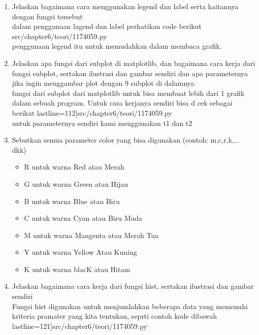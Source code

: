 \begin {enumerate}
\begin {enumerate}
					\item stack plot
					\\Penggunaan stack plot ini seperti diagram line, dengan warna yang mengisinua, serta antar line itu bisa berdekatan. Berikut Contoh penggunaannya
						 lastline=83]{src/chapter6/teori/1174059.py}
				\end {enumerate}
		\item Jelaskan bagaimana cara menggunakan legend dan label serta kaitannya dengan fungsi tersebut
		\\ dalam penggunaan lagend dan label perhatikan code berikut
			{src/chapter6/teori/1174059.py}
		\\ penggunaan legend itu untuk memudahkan dalam membaca grafik.
		\item Jelaskan apa fungsi dari subplot di matplotlib, dan bagaimana cara kerja dari fungsi subplot, sertakan ilustrasi dan gambar sendiri dan apa parameternya jika ingin menggambar plot dengan 9 subplot di dalamnya
		\\fungsi dari subplot dari matplotlib untuk bisa membuat lebih dari 1 grafik dalam sebuah program. Untuk cara kerjanya sendiri bisa d cek sebagai berikut
			 lastline=112]{src/chapter6/teori/1174059.py}
		\\untuk parameternya sendiri kami menggunakan t1 dan t2
		\item Sebutkan semua parameter color yang bisa digunakan (contoh: m,c,r,k,... dkk)
			\begin {itemize}
				\item R untuk warna Red atau Merah
				\item G untuk warna Green atau Hijau
				\item B untuk warna Blue atau Biru
				\item C untuk warna Cyan atau Biru Muda
				\item M untuk warna Mangenta atau Merah Tua
				\item Y untuk warna Yellow Atau Kuning
				\item K untuk warna blacK atau Hitam
			\end {itemize}
		\item Jelaskan bagaimana cara kerja dari fungsi hist, sertakan ilustrasi dan gambar sendiri
		\\ Fungsi hist digunakan untuk menjumlahkan beberapa data yang memenuhi kriteria pramater yang kita tentukan, seprti contoh kode dibawah
			 lastline=121]{src/chapter6/teori/1174059.py}

\end{enumerate}
